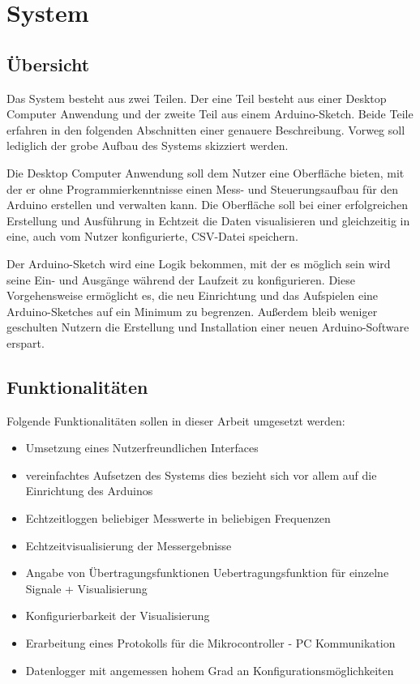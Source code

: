 \chapter{System}
\section{Übersicht}
Das System besteht aus zwei Teilen. Der eine Teil besteht aus einer Desktop Computer Anwendung und der zweite Teil  aus einem Arduino-Sketch.
Beide Teile erfahren in den folgenden Abschnitten einer genauere Beschreibung. Vorweg soll lediglich der grobe Aufbau des Systems skizziert werden.

Die Desktop Computer Anwendung soll dem Nutzer eine Oberfläche bieten, mit der er ohne Programmierkenntnisse einen Mess- und Steuerungsaufbau für den Arduino erstellen und verwalten kann. Die Oberfläche soll bei einer erfolgreichen Erstellung und Ausführung  in Echtzeit die Daten visualisieren und gleichzeitig in eine, auch vom Nutzer konfigurierte, \acrshort{CSV}-Datei speichern.

Der Arduino-Sketch wird eine Logik bekommen, mit der es möglich sein wird seine Ein- und Ausgänge während der Laufzeit zu konfigurieren. Diese Vorgehensweise ermöglicht es, die neu Einrichtung und das Aufspielen eine Arduino-Sketches auf ein Minimum zu begrenzen. Außerdem bleib weniger geschulten Nutzern die Erstellung und Installation einer neuen Arduino-Software erspart.


\section{Funktionalitäten}
Folgende Funktionalitäten sollen in dieser Arbeit umgesetzt werden:
\begin{itemize}
 \item Umsetzung eines Nutzerfreundlichen Interfaces
 \item vereinfachtes Aufsetzen des Systems
 \subitem dies bezieht sich vor allem auf die Einrichtung des Arduinos
 \item Echtzeitloggen beliebiger Messwerte in beliebigen Frequenzen
 \item Echtzeitvisualisierung der Messergebnisse
 \item Angabe von Übertragungsfunktionen \gls{Uebertragungsfunktion} für einzelne Signale + Visualisierung
 \item Konfigurierbarkeit der Visualisierung
 \item Erarbeitung eines Protokolls für die Mikrocontroller - PC Kommunikation
 \item Datenlogger mit angemessen hohem Grad an Konfigurationsmöglichkeiten
\end{itemize}

